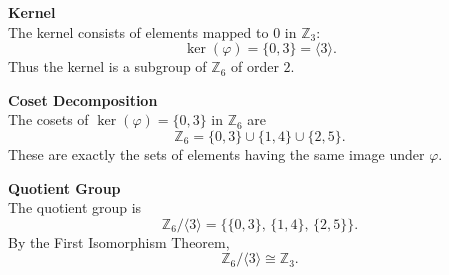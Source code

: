 \documentclass[a4paper,12pt]{article}
\theoremstyle{definition}
\begin{document}
\smallskip
\noindent\textbf{Kernel}\\
The kernel consists of elements mapped to $0$ in $\mathbb{Z}_3$:
\begin{equation*}
\ker(\varphi)
=
\{0,3\}
=
\langle 3 \rangle.
\end{equation*}
Thus the kernel is a subgroup of $\mathbb{Z}_6$ of order $2$.

\smallskip
\noindent\textbf{Coset Decomposition}\\
The cosets of $\ker(\varphi)=\{0,3\}$ in $\mathbb{Z}_6$ are
\begin{equation*}
\mathbb{Z}_6
=
\{0,3\}
\cup
\{1,4\}
\cup
\{2,5\}.
\end{equation*}
These are exactly the sets of elements having the same image under $\varphi$.

\smallskip

\noindent\textbf{Quotient Group} \\
The quotient group is
\begin{equation*}
\mathbb{Z}_6 / \langle 3 \rangle
=
\big\{
\{0,3\},\,
\{1,4\},\,
\{2,5\}
\big\}.
\end{equation*}
By the First Isomorphism Theorem,
\begin{equation*}
\mathbb{Z}_6 / \langle 3 \rangle
\cong
\mathbb{Z}_3.
\end{equation*}
\end{document}
